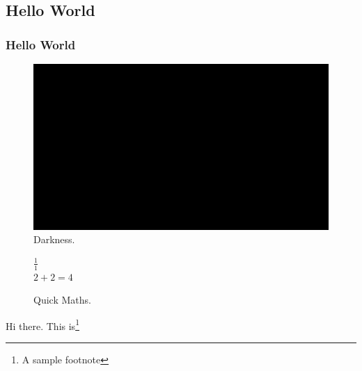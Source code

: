 \subsection{Hello World}
\subsubsection{Hello World}

\begin{figure}[h]
  \includegraphics[width=\linewidth]{external_content/media/black.png}
  \caption{Darkness.}
  \label{fig:black}
\end{figure}

\begin{figure}[h]
  \center
  $\frac{1}{1}$\vspace{2mm}\\

  $2+2=4$
  \caption{Quick Maths.}
  \label{fig:quickmaths}
\end{figure}

Hi there. This is\footnote{A sample footnote}

\clearpage
